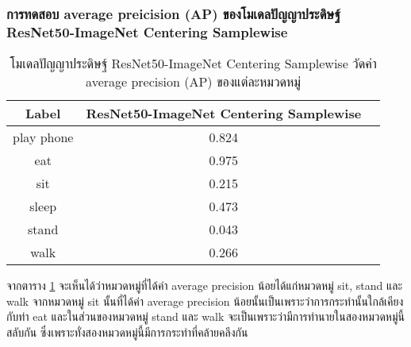 \subsubsection{การทดสอบ average preicision (AP) ของโมเดลปัญญาประดิษฐ์ ResNet50-ImageNet Centering Samplewise}
\begin{table}[!ht]
	\centering
	\begin{tabular}{|c|c|c|}
			\hline
			{Label}&{ResNet50-ImageNet Centering Samplewise}			\\
			\hline
			play phone					& 0.824			\\
			eat						& 0.975			\\
			sit						& 0.215			\\
			sleep						& 0.473			\\
			stand						& 0.043			\\
			walk						& 0.266			\\
			\hline
	\end{tabular}
\caption{โมเดลปัญญาประดิษฐ์ ResNet50-ImageNet	 Centering Samplewise วัดค่า average precision (AP) ของแต่ละหมวดหมู่}
\label{tab: ResNet50-ImageNet Centering Samplewise average precision}
\end{table}

จากตาราง \ref{tab: ResNet50-ImageNet Centering Samplewise average precision} จะเห็นได้ว่าหมวดหมู่ที่ได้ค่า average precision น้อยได้แก่หมวดหมู่ sit, stand และ walk จากหมวดหมู่ sit นั้นที่ได้ค่า  average precision น้อยนั้นเป็นเพราะว่าการกระทำนั้นใกล้เคียงกับท่า eat และในส่วนของหมวดหมู่ stand และ walk จะเป็นเพราะว่ามีการทำนายในสองหมวดหมู่นี้สลับกัน ซึ่งเพราะทั่งสองหมวดหมู่นี้มีการกระทำที่คล้ายคลึงกัน

